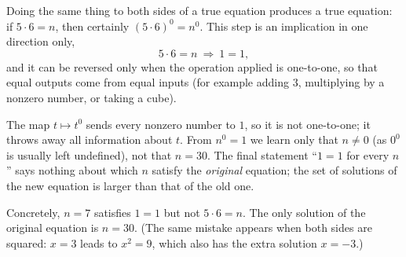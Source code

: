 Doing the same thing to both sides of a true equation produces a true equation: if $5\cdot6=n$, then certainly $(5\cdot6)^0=n^0$. This step is an implication in one direction only,
\[
5\cdot6=n\ \Longrightarrow\ 1=1 ,
\]
and it can be reversed only when the operation applied is one-to-one, so that equal outputs come from equal inputs (for example adding $3$, multiplying by a nonzero number, or taking a cube).

The map $t\mapsto t^0$ sends every nonzero number to $1$, so it is not one-to-one; it throws away all information about $t$. From $n^0=1$ we learn only that $n\ne0$ (as $0^0$ is usually left undefined), not that $n=30$. The final statement ``$1=1$ for every $n$'' says nothing about which $n$ satisfy the \emph{original} equation; the set of solutions of the new equation is larger than that of the old one.

Concretely, $n=7$ satisfies $1=1$ but not $5\cdot6=n$. The only solution of the original equation is $n=\boxed{30}$. (The same mistake appears when both sides are squared: $x=3$ leads to $x^2=9$, which also has the extra solution $x=-3$.)
